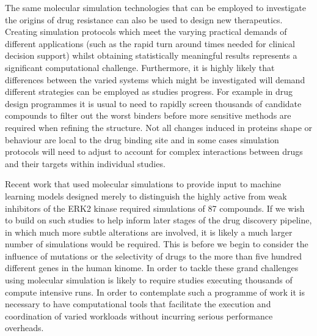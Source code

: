 The same molecular simulation technologies that can be employed to investigate
the origins of drug resistance can also be used to design new therapeutics.
Creating simulation protocols which meet the varying practical demands of
different applications (such as the rapid turn around times needed for
clinical decision support) whilst obtaining statistically meaningful results
represents a significant computational challenge. Furthermore, it is highly
likely that differences between the varied systems which might be investigated
will demand different strategies can be employed as studies progress. For
example in drug design programmes it is usual to need to rapidly screen
thousands of candidate compounds to filter out the worst binders before more
sensitive methods are required when refining the structure. 
Not all changes induced in proteins shape or behaviour are local to the drug binding 
site and in some cases simulation protocols will need to adjust to account for 
complex interactions between drugs and their targets within individual studies.


Recent work that used molecular simulations to provide input to machine learning 
models \cite{Ash2017} designed merely to distinguish the highly active from weak 
inhibitors of the ERK2 kinase required simulations of 87 compounds.
If we wish to build on such studies to help inform later stages of the drug 
discovery pipeline, in which much more subtle alterations are involved, it is 
likely a much larger number of simulations would be required.
This is before we begin to consider the influence of mutations or the selectivity 
of drugs to the more than five hundred different genes in the human kinome. 
\cite{Li2016} In order to tackle these grand challenges using molecular simulation is 
likely to require studies executing thousands of compute intensive runs.
In order to contemplate such a programme of work it is necessary to
have computational tools that facilitate the execution and coordination of
varied workloads without incurring serious performance overheads.





